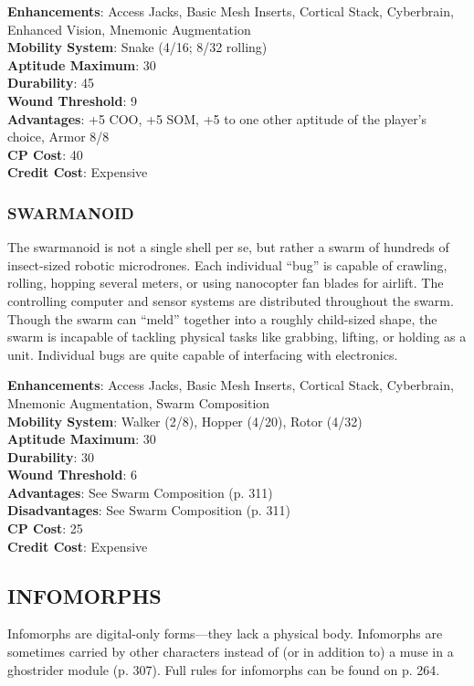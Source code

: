 \textbf{Enhancements}: Access Jacks, Basic Mesh Inserts, Cortical Stack, Cyberbrain, Enhanced Vision, Mnemonic Augmentation \\
\textbf{Mobility System}: Snake (4/16; 8/32 rolling) \\
\textbf{Aptitude Maximum}: 30 \\
\textbf{Durability}: 45 \\
\textbf{Wound Threshold}: 9 \\
\textbf{Advantages}: +5 COO, +5 SOM, +5 to one other aptitude of the player’s choice, Armor 8/8 \\
\textbf{CP Cost}: 40 \\
\textbf{Credit Cost}: Expensive

\subsubsection{SWARMANOID}
The swarmanoid is not a single shell per se, but rather a swarm of hundreds of
insect-sized robotic microdrones. Each individual “bug” is capable of
crawling, rolling, hopping several meters, or using nanocopter fan blades for
airlift. The controlling computer and sensor systems are distributed throughout
the swarm.  Though the swarm can “meld” together into a roughly child-sized
shape, the swarm is incapable of tackling physical tasks like grabbing,
lifting, or holding as a unit. Individual bugs are quite capable of interfacing
with electronics.

\textbf{Enhancements}: Access Jacks, Basic Mesh Inserts, Cortical Stack, Cyberbrain, Mnemonic Augmentation, Swarm Composition \\
\textbf{Mobility System}: Walker (2/8), Hopper (4/20), Rotor (4/32) \\
\textbf{Aptitude Maximum}: 30 \\
\textbf{Durability}: 30 \\
\textbf{Wound Threshold}: 6 \\
\textbf{Advantages}: See Swarm Composition (p. 311) \\
\textbf{Disadvantages}: See Swarm Composition (p. 311) \\
\textbf{CP Cost}: 25 \\
\textbf{Credit Cost}: Expensive

\subsection{INFOMORPHS}
Infomorphs are digital-only forms—they lack a physical body. Infomorphs are
sometimes carried by other characters instead of (or in addition to) a muse in
a ghostrider module (p. 307). Full rules for infomorphs can be found on p. 264.

